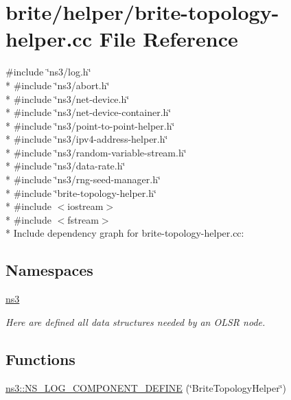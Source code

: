 \hypertarget{brite-topology-helper_8cc}{}\section{brite/helper/brite-\/topology-\/helper.cc File Reference}
\label{brite-topology-helper_8cc}
{\ttfamily \#include \char`\"{}ns3/log.\+h\char`\"{}}\\*
{\ttfamily \#include \char`\"{}ns3/abort.\+h\char`\"{}}\\*
{\ttfamily \#include \char`\"{}ns3/net-\/device.\+h\char`\"{}}\\*
{\ttfamily \#include \char`\"{}ns3/net-\/device-\/container.\+h\char`\"{}}\\*
{\ttfamily \#include \char`\"{}ns3/point-\/to-\/point-\/helper.\+h\char`\"{}}\\*
{\ttfamily \#include \char`\"{}ns3/ipv4-\/address-\/helper.\+h\char`\"{}}\\*
{\ttfamily \#include \char`\"{}ns3/random-\/variable-\/stream.\+h\char`\"{}}\\*
{\ttfamily \#include \char`\"{}ns3/data-\/rate.\+h\char`\"{}}\\*
{\ttfamily \#include \char`\"{}ns3/rng-\/seed-\/manager.\+h\char`\"{}}\\*
{\ttfamily \#include \char`\"{}brite-\/topology-\/helper.\+h\char`\"{}}\\*
{\ttfamily \#include $<$iostream$>$}\\*
{\ttfamily \#include $<$fstream$>$}\\*
Include dependency graph for brite-\/topology-\/helper.cc\+:
\subsection*{Namespaces}
\begin{DoxyCompactItemize}
\item 
 \hyperlink{namespacens3}{ns3}
\begin{DoxyCompactList}\small\item\em Here are defined all data structures needed by an O\+L\+SR node. \end{DoxyCompactList}\end{DoxyCompactItemize}
\subsection*{Functions}
\begin{DoxyCompactItemize}
\item 
\hyperlink{namespacens3_aff4d8d3d7d838f1ea6eacf1a55fd9d1e}{ns3\+::\+N\+S\+\_\+\+L\+O\+G\+\_\+\+C\+O\+M\+P\+O\+N\+E\+N\+T\+\_\+\+D\+E\+F\+I\+NE} (\char`\"{}Brite\+Topology\+Helper\char`\"{})
\end{DoxyCompactItemize}
